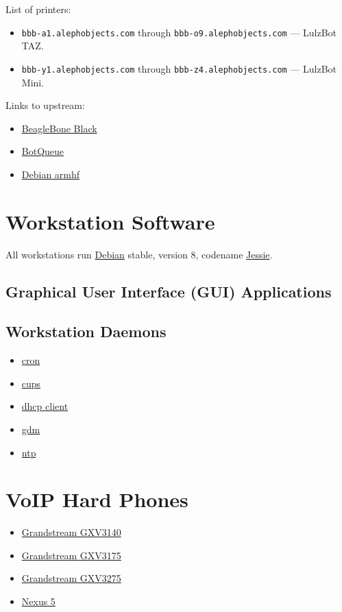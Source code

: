 List of printers:
\begin{itemize}
\item \texttt{bbb-a1.alephobjects.com} through
      \texttt{bbb-o9.alephobjects.com} --- LulzBot TAZ.
\item \texttt{bbb-y1.alephobjects.com} through
      \texttt{bbb-z4.alephobjects.com} --- LulzBot Mini.
\end{itemize}

Links to upstream:
\begin{itemize}
\item \href{http://beagleboard.org/}{BeagleBone Black}
\item \href{http://botqueue.org/}{BotQueue}
\item \href{https://wiki.debian.org/ArmHardFloatPort}{Debian armhf}
\end{itemize}

\section{Workstation Software}

All workstations run \href{http://www.debian.org/}{Debian} stable, version 8,
codename \href{https://www.debian.org/releases/jessie/}{Jessie}.

\subsection{Graphical User Interface (GUI) Applications}


\subsection{Workstation Daemons}
\begin{itemize}
\item \href{http://ftp.isc.org/isc/cron/}{cron}
\item \href{http://www.cups.org/}{cups}
\item \href{http://www.isc.org/}{dhcp client}
\item \href{https://wiki.gnome.org/Projects/GDM}{gdm}
\item \href{http://support.ntp.org/}{ntp}
\end{itemize}

\section{VoIP Hard Phones}
\begin{itemize}
\item \href{https://www.grandstream.com/products/ip-video-telephony/gxv3140/}{Grandstream GXV3140}
\item \href{https://www.grandstream.com/products/ip-video-telephony/gxv3175/}{Grandstream GXV3175}
\item \href{https://www.grandstream.com/products/ip-video-telephony/gxv3275/}{Grandstream GXV3275}
\item \href{http://www.google.com/nexus/5/}{Nexus 5}
\end{itemize}

